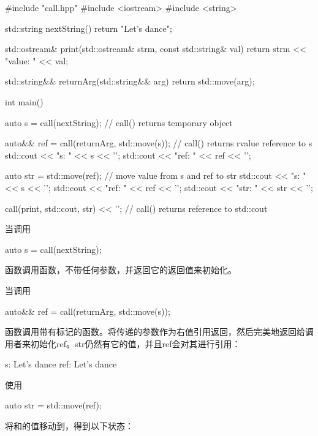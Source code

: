 \begin{cppcode}
#include "call.hpp"
#include <iostream>
#include <string>

std::string nextString()
{
	return "Let's dance";
}

std::ostream& print(std::ostream& strm, const std::string& val)
{
	return strm << "value: " << val;
}

std::string&& returnArg(std::string&& arg)
{
	return std::move(arg);
}

int main()
{
	auto s = call(nextString); // call() returns temporary object

	auto&& ref = call(returnArg, std::move(s)); // call() returns rvalue reference to s
	std::cout << "s: " << s << '\n';
	std::cout << "ref: " << ref << '\n';

	auto str = std::move(ref); // move value from s and ref to str
	std::cout << "s: " << s << '\n';
	std::cout << "ref: " << ref << '\n';
	std::cout << "str: " << str << '\n';

	call(print, std::cout, str) << '\n'; // call() returns reference to std::cout
}
\end{cppcode}

当调用

\begin{cppcode}
auto s = call(nextString);
\end{cppcode}

函数调用函数，不带任何参数，并返回它的返回值来初始化。

当调用

\begin{cppcode}
auto&& ref = call(returnArg, std::move(s));
\end{cppcode}

函数调用带有标记的函数。将传递的参数作为右值引用返回，然后完美地返回给调用者来初始化ref。str仍然有它的值，并且ref会对其进行引用：

\begin{outputcode}
s: Let's dance
ref: Let's dance
\end{outputcode}

使用

\begin{cppcode}
auto str = std::move(ref);
\end{cppcode}

将和的值移动到，得到以下状态：

